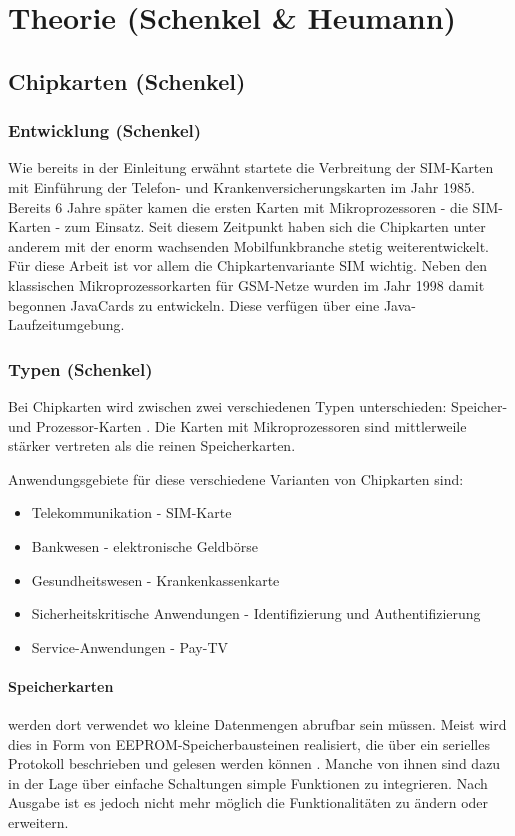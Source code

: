 \clearpage

\section{Theorie (Schenkel \& Heumann)}
\label{theorie}

\subsection{Chipkarten (Schenkel)}
\subsubsection{Entwicklung (Schenkel)}
Wie bereits in der Einleitung erwähnt startete die Verbreitung der SIM-Karten
mit Einführung der Telefon- und Krankenversicherungskarten im Jahr 1985.
Bereits 6 Jahre später kamen die ersten Karten mit Mikroprozessoren - die \ac{SIM}-Karten
- zum Einsatz. Seit diesem Zeitpunkt haben sich die Chipkarten unter anderem
mit der enorm wachsenden Mobilfunkbranche stetig weiterentwickelt. Für diese
Arbeit ist vor allem die Chipkartenvariante \ac{SIM} wichtig.
Neben den klassischen Mikroprozessorkarten für \ac{GSM}-Netze wurden im Jahr
1998 damit begonnen JavaCards zu entwickeln. Diese verfügen über eine
Java-Laufzeitumgebung.

\subsubsection{Typen (Schenkel)}
Bei Chipkarten wird zwischen zwei verschiedenen Typen unterschieden:
Speicher- und Prozessor-Karten \cite{chipkarten02}. Die Karten mit Mikroprozessoren
sind mittlerweile stärker vertreten als die reinen Speicherkarten.

Anwendungsgebiete für diese verschiedene Varianten von Chipkarten sind:
\begin{itemize}
\item Telekommunikation - \ac{SIM}-Karte
\item Bankwesen - elektronische Geldbörse
\item Gesundheitswesen - Krankenkassenkarte
\item Sicherheitskritische Anwendungen - Identifizierung und Authentifizierung
\item Service-Anwendungen - Pay-TV
\end{itemize}

\paragraph{Speicherkarten} werden dort verwendet wo kleine Datenmengen abrufbar
sein müssen. Meist wird dies in Form von \ac{EEPROM}-Speicherbausteinen realisiert,
die über ein serielles Protokoll beschrieben und gelesen werden können \cite{spitz11}.
Manche von ihnen sind dazu in der Lage über einfache Schaltungen simple Funktionen
zu integrieren. Nach Ausgabe ist es jedoch nicht mehr möglich die Funktionalitäten
zu ändern oder erweitern.

